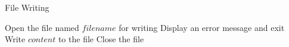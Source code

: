 \documentclass{article}
\begin{document}
\begin{algorithm}
\caption{File Writing}
\begin{algorithmic}[1]
    \State Open the file named $filename$ for writing
        \State Display an error message and exit
    \EndIf
    \State Write $content$ to the file
    \State Close the file
\EndProcedure
\end{algorithmic}
\end{algorithm}
\end{document}
